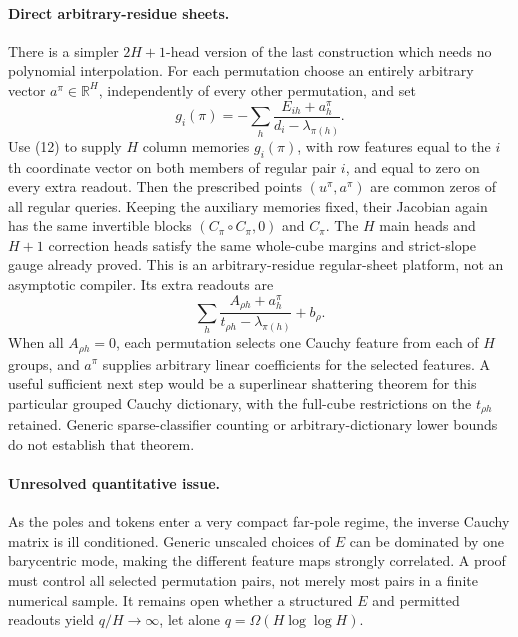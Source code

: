 \documentclass[11pt]{article}
\begin{document}
\paragraph{Direct arbitrary-residue sheets.}
There is a simpler $2H+1$-head version of the last construction
which needs no polynomial interpolation. For each permutation choose
an entirely arbitrary vector $a^\pi\in\mathbb R^H$, independently
of every other permutation, and set
\[
 g_i(\pi)=-\sum_h\frac{E_{ih}+a_h^\pi}{d_i-\lambda_{\pi(h)}}.
\]
Use (12) to supply $H$ column memories $g_i(\pi)$, with row features
equal to the $i$th coordinate vector on both members of regular pair
$i$, and equal to zero on every extra readout. Then the prescribed
points $(u^\pi,a^\pi)$ are common zeros of all regular queries.
Keeping the auxiliary memories fixed, their Jacobian again has the
same invertible blocks $(C_\pi\circ C_\pi,0)$ and $C_\pi$.
The $H$ main heads and $H+1$ correction heads satisfy the same
whole-cube margins and strict-slope gauge already proved. This is
an arbitrary-residue regular-sheet platform, not an asymptotic
compiler. Its extra readouts are
\[
 \sum_h\frac{A_{\rho h}+a_h^\pi}
                  {t_{\rho h}-\lambda_{\pi(h)}}+b_\rho.
\]
When all $A_{\rho h}=0$, each permutation selects one Cauchy feature
from each of $H$ groups, and $a^\pi$ supplies arbitrary linear
coefficients for the selected features. A useful sufficient next
step would be a superlinear shattering theorem for this particular
grouped Cauchy dictionary, with the full-cube restrictions on the
$t_{\rho h}$ retained. Generic sparse-classifier counting or
arbitrary-dictionary lower bounds do not establish that theorem.

\paragraph{Unresolved quantitative issue.}
As the poles and tokens enter a very compact far-pole regime, the
inverse Cauchy matrix is ill conditioned. Generic unscaled choices
of $E$ can be dominated by one barycentric mode, making the different
feature maps strongly correlated. A proof must control all selected
permutation pairs, not merely most pairs in a finite numerical sample.
It remains open whether a structured $E$ and permitted readouts yield
$q/H\to\infty$, let alone $q=\Omega(H\log\log H)$.
\end{document}
